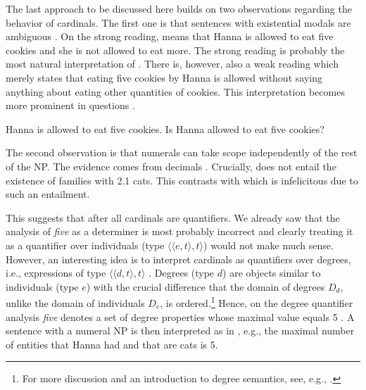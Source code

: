 \documentclass[output=paper]{langscibook}
\begin{document}
	The last approach to be discussed here builds on two observations regarding the behavior of cardinals. The first one is that sentences with existential modals  are ambiguous \citep{kennedy2013scalar,kennedy2015de-fregean}. On the strong reading,  means that Hanna is allowed to eat five cookies and she is not allowed to eat more. The strong reading is probably the most natural interpretation of . There is, however, also a weak reading which merely states that eating five cookies by Hanna is allowed without saying anything about eating other quantities of cookies. This interpretation becomes more prominent in questions .

	\ea\label{ex:numeral-modal} \ea Hanna is allowed to eat five cookies.\label{ex:numeral-modal-assertion}
	\ex Is Hanna allowed to eat five cookies?\label{ex:numeral-modal-question}
	\z
	\z
	
	\noindent The second observation is that numerals can take scope independently of the rest of the NP. The evidence comes from decimals \citep{kennedy_stanley2009average}. Crucially,  does not entail the existence of families with 2.1 cats. This contrasts with  which is infelicitous due to such an entailment.
	
	\ea\label{ex:decimal} \label{ex:decimal-average}
	\label{ex:decimal-normal}
	\z
	\z
	
	\noindent This suggests that after all cardinals are quantifiers. We already saw that the analysis of \textit{five} as a determiner is most probably incorrect and clearly treating it as a quantifier over individuals (type $\langle\langle e,t\rangle,t\rangle$) would not make much sense. However, an interesting idea is to interpret cardinals as quantifiers over degrees, i.e., expressions of type $\langle\langle d,t\rangle,t\rangle$ \citep{kennedy2013scalar,kennedy2015de-fregean}. Degrees (type $d$) are objects similar to individuals (type $e$) with the crucial difference that the domain of degrees $D_d$, unlike the domain of individuals $D_e$, is ordered.\footnote{For more discussion and an introduction to degree semantics, see, e.g., \citet[][Ch. 3]{morzycki2016modification}.} Hence, on the degree quantifier analysis \textit{five} denotes a set of degree properties whose maximal value equals 5 . A sentence with a numeral NP is then interpreted as in , e.g., the maximal number of entities that Hanna had and that are cats is 5.
	
\end{document}
